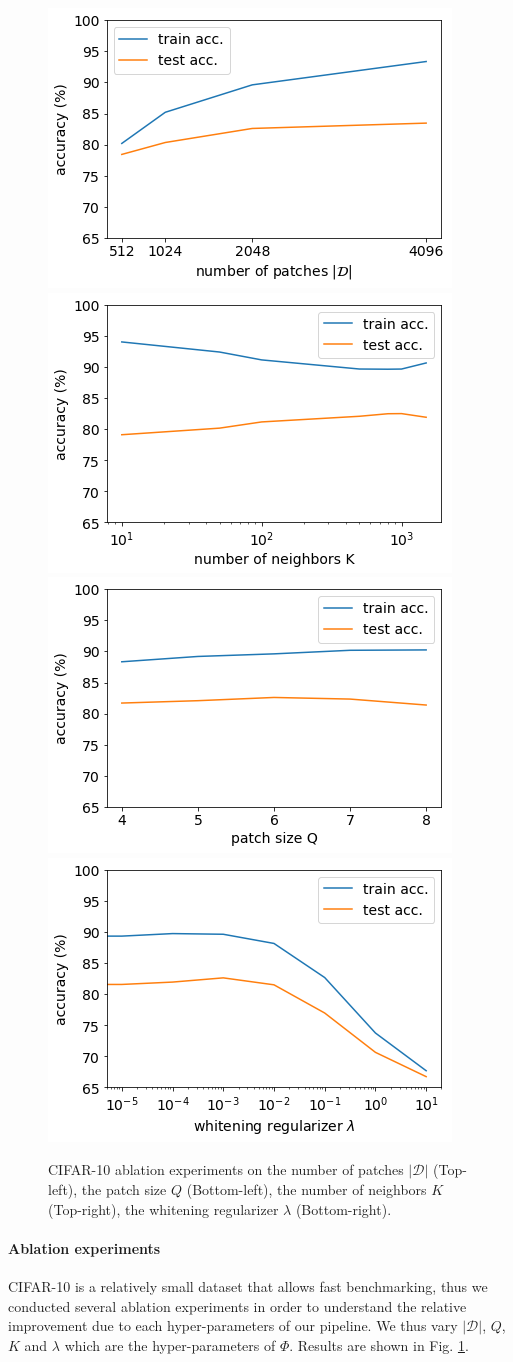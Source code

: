 \documentclass{article}
\begin{document}
\begin{figure} 
  
  \centering
   \includegraphics[width=0.35\linewidth]{figures/albation_study_npatches.png}
  \includegraphics[width=0.35\linewidth]{figures/albation_study_K.png}
  \includegraphics[width=0.35\linewidth]{figures/albation_study_Q.png}
  \includegraphics[width=0.35\linewidth]{figures/albation_study_lambda.png}\\
  \caption{CIFAR-10 ablation experiments on the number of patches  $|\mathcal{D}|$ (Top-left), the patch size $Q$ (Bottom-left), the number of neighbors $K$ (Top-right), the whitening regularizer $\lambda$ (Bottom-right).\label{fig:ablation_study}}
\end{figure}




\paragraph{Ablation experiments}
CIFAR-10 is a relatively small dataset that allows fast benchmarking, thus we conducted several ablation experiments in order to understand the relative improvement due to each hyper-parameters of our pipeline. We thus vary $|\mathcal{D}|$, $Q$, $K$ and $\lambda$ which are the hyper-parameters of $\Phi$. Results are shown in Fig. \ref{fig:ablation_study}.
\end{document}
